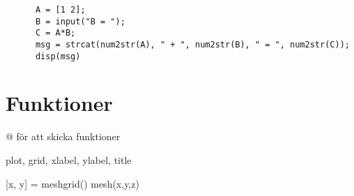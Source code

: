 \begin{frame}[fragile]
  \begin{example}[Strängar]
    \begin{verbatim}
      A = [1 2];
      B = input("B = ");
      C = A*B;
      msg = strcat(num2str(A), " + ", num2str(B), " = ", num2str(C));
      disp(msg)
    \end{verbatim}
  \end{example}
\end{frame}


\section{Funktioner}

@ för att skicka funktioner

plot, grid, xlabel, ylabel, title

[x, y] = meshgrid()
mesh(x,y,z)


